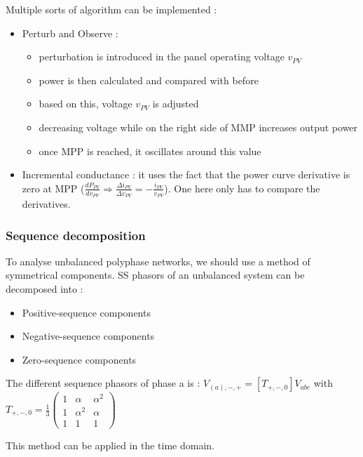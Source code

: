 \documentclass[../main.tex]{subfiles}
\begin{document}
Multiple sorts of algorithm can be implemented : \begin{itemize}
    \item Perturb and Observe : \begin{itemize}
        \item perturbation is introduced in the panel operating voltage $v_{PV}$
        \item power is then calculated and compared with before
        \item based on this, voltage $v_{PV}$ is adjusted
        \item decreasing voltage while on the right side of MMP increases output power
        \item once MPP is reached, it oscillates around this value
    \end{itemize}
    \item Incremental conductance : it uses the fact that the power curve derivative is zero at MPP ($\frac{d P_{PV}}{dv_{PV}} \Rightarrow \frac{\Delta i_{PV}}{ \Delta v_{PV}} = - \frac{i_{PV}}{v_{PV}}$). One here only has to compare the derivatives.
\end{itemize}

\subsubsection{Sequence decomposition}
To analyse unbalanced polyphase networks, we should use a method of symmetrical components. SS phasors of an unbalanced system can be decomposed into : \begin{itemize}
    \item Positive-sequence components
    \item Negative-sequence components
    \item Zero-sequence components
\end{itemize}

The different sequence phasors of phase a is : $V_{(a),-,+} = [T_{+,-,0}] V_{abc}$ with $T_{+,-,0} = \frac{1}{3} \begin{pmatrix}
    1 & \alpha & \alpha^2\\
    1 & \alpha^2 & \alpha\\
    1 & 1 & 1
\end{pmatrix}$

This method can be applied in the time domain. \\
\end{document}
